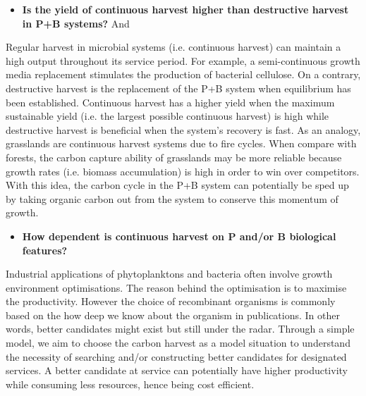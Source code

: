 \documentclass[../thesis.tex]{subfiles} %
\begin{document}
\begin{itemize}
    \item \textbf{
    Is the yield of continuous harvest higher than destructive harvest in P+B systems?
    } And
\end{itemize}

Regular harvest in microbial systems (i.e. continuous harvest) can maintain a high output throughout its service period.  For example, a semi-continuous growth media replacement stimulates the production of bacterial cellulose.\autocite{aytekin2016statistical}  On a contrary, destructive harvest is the replacement of the P+B system when equilibrium has been established.  Continuous harvest has a higher yield when the maximum sustainable yield (i.e. the largest possible continuous harvest) is high while destructive harvest is beneficial when the system's recovery is fast.  As an analogy, grasslands are continuous harvest systems due to fire cycles.  When compare with forests, the carbon capture ability of grasslands may be more reliable\autocite{dass2018grasslands} because growth rates (i.e. biomass accumulation) is high in order to win over competitors.  With this idea, the carbon cycle in the P+B system can potentially be sped up by taking organic carbon out from the system to conserve this momentum of growth.

\begin{itemize}
    \item \textbf{
    How dependent is continuous harvest on P and/or B biological features?
    }
\end{itemize}

Industrial applications of phytoplanktons and bacteria often involve growth environment optimisations.\autocite{dash2013marine,naik2013lead,huang2012industrial,evanson_2019}  The reason behind the optimisation is to maximise the productivity.  However the choice of recombinant organisms is commonly based on the how deep we know about the organism in publications.\autocite{huang2012industrial}  In other words, better candidates might exist but still under the radar.  Through a simple model, we aim to choose the carbon harvest as a model situation to understand the necessity of searching and/or constructing better candidates for designated services.  A better candidate at service can potentially have higher productivity while consuming less resources, hence being cost efficient.
\end{document}
